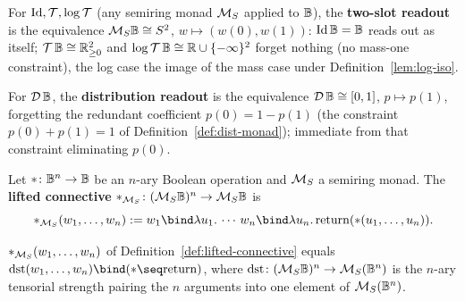 \begin{definition}
\label{def:two-slot}
\leanok
For $\mathrm{Id},\mathcal T,\log\mathcal T$ (any semiring monad $\mathcal M_{S}$ applied to
$\mathbb B$), the \textbf{two-slot readout} is the equivalence $\mathcal M_{S}
\mathbb B \cong S^2$, $w \mapsto (w(0), w(1))$: $\mathrm{Id}\,\mathbb B = \mathbb B$
reads out as itself; $\mathcal T\,\mathbb B \cong \mathbb R_{\ge 0}^2$ and
$\log\mathcal T\,\mathbb B \cong \mathbb R \cup \{-\infty\}^2$ forget nothing (no mass-one
constraint), the log case the image of the mass case under
Definition~\ref{lem:log-iso}.
\end{definition}

\begin{definition}
\label{def:dist-readout}
\leanok
For $\mathcal D\,\mathbb B$, the \textbf{distribution readout} is the
equivalence $\mathcal D\,\mathbb B \cong [0,1]$, $p \mapsto p(1)$, forgetting
the redundant coefficient $p(0) = 1 - p(1)$ (the constraint
$p(0)+p(1)=1$ of Definition~\ref{def:dist-monad}); immediate from that
constraint eliminating $p(0)$.
\end{definition}

\begin{definition}
\label{def:lifted-connective}
\leanok
Let $* \colon \mathbb B^n \to \mathbb B$ be an $n$-ary Boolean operation and
$\mathcal M_{S}$ a semiring monad. The \textbf{lifted connective}
$*_{\mathcal M_{S}} \colon (\mathcal M_{S}\mathbb B)^n \to \mathcal M_{S}\mathbb B$ is
\[
  *_{\MS{S}}(w_1,\ldots,w_n)
  := w_1 \bind \lambda u_1.\, \cdots\, w_n \bind \lambda u_n.\,
     \Ret(*(u_1,\ldots,u_n)).
\]
\end{definition}

\begin{lemma}
\label{lem:lifted-connective-strength}
\leanok
$*_{\mathcal M_{S}}(w_1,\ldots,w_n)$ of Definition~\ref{def:lifted-connective}
equals $\mathrm{dst}(w_1,\ldots,w_n) \bind (* \seq \Ret)$, where
$\mathrm{dst} \colon (\mathcal M_{S}\mathbb B)^n \to \mathcal M_{S}(\mathbb B^n)$ is the
$n$-ary tensorial strength pairing the $n$ arguments into one element
of $\mathcal M_{S}(\mathbb B^n)$.
\end{lemma}

